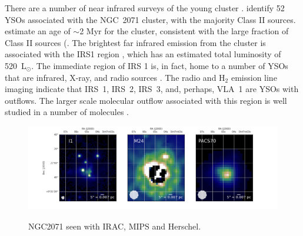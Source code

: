 There are a number of near infrared surveys of the young cluster \citep[e.g.,][]{Strom1976,Lada1991,Megeath2012,Spezzi2015}. \cite{Spezzi2015} identify 52 YSOs associated with the NGC~2071 cluster, with the majority Class II sources. \cite{Flaherty2008} estimate an age of $\sim$2 Myr for the cluster, consistent with the large fraction of Class II sources (\cite{Evans2009}. The brightest far infrared emission from the cluster is associated with the IRS1 region \citep{Harvey1979,Butner1990}, which has an estimated total luminosity of 520~L$_\odot$. The immediate region of IRS 1 is, in fact, home to a number of YSOs that are infrared, X-ray, and radio sources \citep{Skinner2009,C-G2012,Kempen2012}. The radio \citep{C-G2012} and H$_2$ emission line imaging indicate that IRS~1, IRS~2, IRS~3, and, perhaps, VLA~1 are YSOs with outflows. The larger scale molecular outflow associated with this region is well studied in a number of molecules \citep{Bally1982,Chernin1993,Stoji2008}.
\begin{figure}
\begin{center}
\includegraphics[width=\textwidth]{Figures/NGC2071_saturated_mosaic.png}
\label{fig:n2071saturated}
\caption{%
NGC2071 seen with IRAC, MIPS and Herschel.}
\end{center}
\end{figure}

